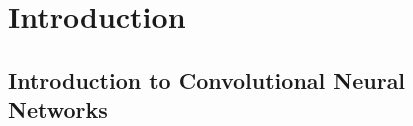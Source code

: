 \documentclass[12pt]{report}
\begin{document}
\begingroup
\makeatletter
\def\@makeschapterhead#1{%
  {\parindent \z@ \raggedright
    \normalfont
    \interlinepenalty\@M
    \Huge \bfseries  #1\par\nobreak
    \vskip 40\p@
  }}
\makeatother
\tableofcontents
\endgroup
\thispagestyle{empty}
\newpage

\begingroup
\makeatletter
\def\@makeschapterhead#1{%
  {\parindent \z@ \raggedright
    \normalfont
    \interlinepenalty\@M
    \Huge \bfseries  #1\par\nobreak
    \vskip 40\p@
  }}
\makeatother
\listoffigures
\endgroup
\thispagestyle{empty}
\newpage

\begingroup
\makeatletter
\def\@makeschapterhead#1{%
  {\parindent \z@ \raggedright
    \normalfont
    \interlinepenalty\@M
    \Huge \bfseries  #1\par\nobreak
    \vskip 40\p@
  }}
\makeatother
\listoftables
\endgroup
\thispagestyle{empty}
\newpage

\chapter{Introduction}
\section{Introduction to Convolutional Neural Networks}
\end{document}

